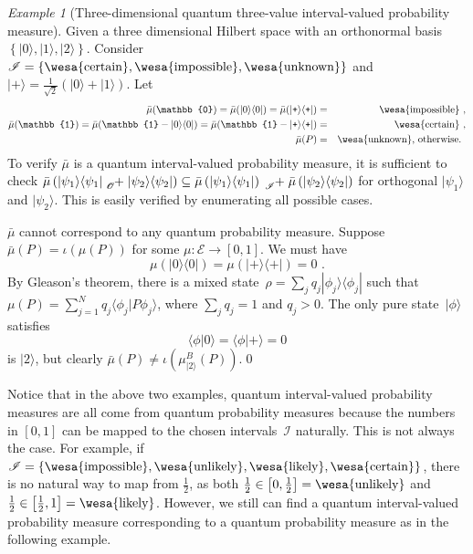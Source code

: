 \documentclass{article}
\theoremstyle{remark}
\newtheorem{example}{Example}
\newcommand{\events}{\ensuremath{\mathcal{E}}}
\newcommand{\ket}[1]{|#1\rangle}
\newcommand{\ip}[2]{\langle #1 | #2 \rangle}
\newcommand{\proj}[1]{|#1 \rangle\langle #1 |}
\newcommand{\ps}{\texttt{+}}
\newcommand{\imposs}{{\mbox{\wesa{impossible}}}}
\newcommand{\likely}{{\mbox{\wesa{likely}}}}
\newcommand{\unlikely}{{\mbox{\wesa{unlikely}}}}
\newcommand{\necess}{{\mbox{\wesa{certain}}}}
\newcommand{\unknown}{{\mbox{\wesa{unknown}}}}
\begin{document}
\begin{example}[Three-dimensional quantum three-value interval-valued
probability measure]\label{ex:three-dimensional-three-value} Given
a three dimensional Hilbert space with an orthonormal basis $\left\{ \ket{0},\ket{1},\ket{2}\right\} $.
Consider\emph{ $\mathscr{I}=\left\{ \necess,\imposs,\unknown\right\} $}
and $\ket{\ps}=\frac{1}{\sqrt{2}}(\ket{0}+\ket{1})$. Let 
\begin{eqnarray*}
\bar{\mu}(\mathbb{0})=\bar{\mu}(\proj{0})=\bar{\mu}(\proj{\ps}) & = & \imposs\textrm{ ,}\\
\bar{\mu}(\mathbb{1})=\bar{\mu}(\mathbb{1}-\proj{0})=\bar{\mu}(\mathbb{1}-\proj{\ps}) & = & \necess\textrm{ ,}\\
\bar{\mu}(P) & = & \unknown\textrm{, otherwise. }
\end{eqnarray*}
To verify $\bar{\mu}$ is a quantum interval-valued probability measure,
it is sufficient to check $\bar{\mu}\left(\proj{\psi_{1}}\tensor*[_{\mathscr{O}}]{+}{}\proj{\psi_{2}}\right)\subseteq\bar{\mu}\left(\proj{\psi_{1}}\right)\tensor*[_{\mathscr{I}}]{+}{}\bar{\mu}\left(\proj{\psi_{2}}\right)$
for orthogonal $\ket{\psi_{1}}$ and $\ket{\psi_{2}}$. This is easily
verified by enumerating all possible cases.

$\bar{\mu}$ cannot correspond to any quantum probability measure.
Suppose $\bar{\mu}(P)=\iota\left(\mu(P)\right)$ for some $\mu:\events\rightarrow\left[0,1\right]$.
We must have 
\begin{equation}
\mu(\proj{0})=\mu(\proj{\ps})=0\textrm{ .}\label{eq:probability-zero-on-states}
\end{equation}
By Gleason's theorem, there is a mixed state~$\rho=\sum_{j}q_{j}\proj{\phi_{j}}$
such that $\mu\left(P\right)=\sum_{j=1}^{N}q_{j}\ip{\phi_{j}}{P\phi_{j}}$,
where $\sum_{j}q_{j}=1$ and $q_{j}>0$. The only pure state~$\ket{\phi}$
satisfies
\[
\ip{\phi}{0}=\ip{\phi}{\ps}=0
\]
is $\ket{2}$, but clearly $\bar{\mu}(P)\ne\iota\left(\mu_{\ket{2}}^{B}(P)\right)$.\qed\end{example}

Notice that in the above two examples, quantum interval-valued probability
measures are all come from quantum probability measures because the
numbers in $\left[0,1\right]$ can be mapped to the chosen intervals~$\mathscr{I}$
naturally. This is not always the case. For example, if $\mathscr{I}=\left\{ \imposs,\unlikely,\likely,\necess\right\} $,
there is no natural way to map from $\frac{1}{2}$, as both $\frac{1}{2}\in\left[0,\frac{1}{2}\right]=\unlikely$
and $\frac{1}{2}\in\left[\frac{1}{2},1\right]=\likely$. However,
we still can find a quantum interval-valued probability measure corresponding
to a quantum probability measure as in the following example.
\end{document}
